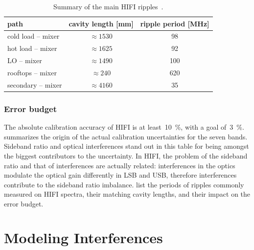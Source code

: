 \begin{table}[p]
    \centering
    \begin{tabular}{lcc}
        \toprule
            path & cavity length [\si{\milli\meter}] & ripple period [\si{\mega\hertz}]\\
        \midrule
            cold load -- mixer & $\approx\num{1530}$ &  98\\
            hot load -- mixer  & $\approx\num{1625}$ &  92\\
            LO -- mixer        & $\approx\num{1490}$ & 100\\
            rooftops -- mixer  & $\approx\num{ 240}$ & 620\\
            secondary -- mixer & $\approx\num{4160}$ &  35\\
        \bottomrule
    \end{tabular}
    \caption{
        Summary of the main HIFI ripples~\parencite{risacher2011standingwaves}.
    }
    \label{tab:ripple_periods}
\end{table}



\FloatBarrier
\subsubsection{Error budget}
\label{sec:error_budget}
The absolute calibration accuracy of HIFI is at least~\SI{10}{\percent}, with a goal of~\SI{3}{\percent}.
 summarizes the origin of the actual calibration uncertainties for the seven bands.
Sideband ratio and optical interferences stand out in this table for being amongst the biggest contributors to the uncertainty.
In HIFI, the problem of the sideband ratio and that of interferences are actually related:
interferences in the optics modulate the optical gain differently in LSB and USB, therefore interferences contribute to the sideband ratio imbalance.
 list the periods of ripples commonly measured on HIFI spectra, their matching cavity lengths, and their impact on the error budget.






\section{Modeling Interferences}

